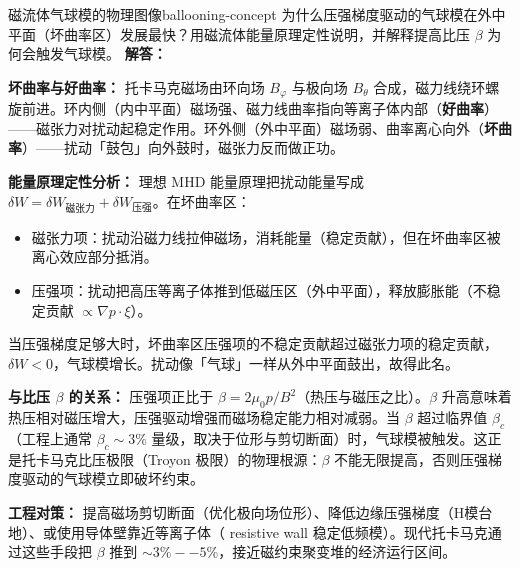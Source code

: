 \begin{example}{磁流体气球模的物理图像}{ballooning-concept}
为什么压强梯度驱动的气球模在外中平面（坏曲率区）发展最快？用磁流体能量原理定性说明，并解释提高比压 $\beta$ 为何会触发气球模。
\tcblower
\textbf{解答：}

\textbf{坏曲率与好曲率：} 托卡马克磁场由环向场 $B_\varphi$ 与极向场 $B_\theta$ 合成，磁力线绕环螺旋前进。环内侧（内中平面）磁场强、磁力线曲率指向等离子体内部（\textbf{好曲率}）——磁张力对扰动起稳定作用。环外侧（外中平面）磁场弱、曲率离心向外（\textbf{坏曲率}）——扰动「鼓包」向外鼓时，磁张力反而做正功。

\textbf{能量原理定性分析：} 理想 MHD 能量原理把扰动能量写成 $\delta W = \delta W_{\text{磁张力}} + \delta W_{\text{压强}}$。在坏曲率区：
\begin{itemize}[leftmargin=*,itemsep=0pt]
\item 磁张力项：扰动沿磁力线拉伸磁场，消耗能量（稳定贡献），但在坏曲率区被离心效应部分抵消。
\item 压强项：扰动把高压等离子体推到低磁压区（外中平面），释放膨胀能（不稳定贡献 $\propto \nabla p\cdot\xi$）。
\end{itemize}
当压强梯度足够大时，坏曲率区压强项的不稳定贡献超过磁张力项的稳定贡献，$\delta W<0$，气球模增长。扰动像「气球」一样从外中平面鼓出，故得此名。

\textbf{与比压 $\beta$ 的关系：} 压强项正比于 $\beta = 2\mu_0 p/B^2$（热压与磁压之比）。$\beta$ 升高意味着热压相对磁压增大，压强驱动增强而磁场稳定能力相对减弱。当 $\beta$ 超过临界值 $\beta_c$（工程上通常 $\beta_c\sim3\%$ 量级，取决于位形与剪切断面）时，气球模被触发。这正是托卡马克比压极限（Troyon 极限）的物理根源：$\beta$ 不能无限提高，否则压强梯度驱动的气球模立即破坏约束。

\textbf{工程对策：} 提高磁场剪切断面（优化极向场位形）、降低边缘压强梯度（H模台地）、或使用导体壁靠近等离子体（ resistive wall 稳定低频模）。现代托卡马克通过这些手段把 $\beta$ 推到 $\sim3\%--5\%$，接近磁约束聚变堆的经济运行区间。
\end{example}

